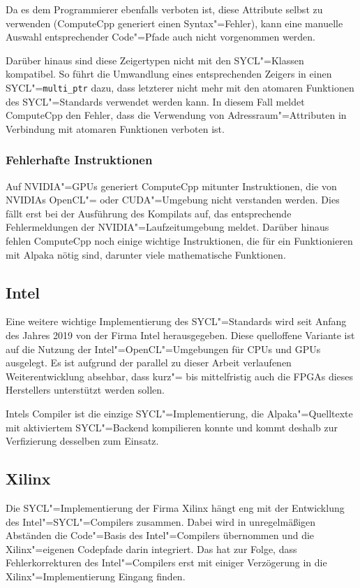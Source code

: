 Da es dem Programmierer ebenfalls verboten ist, diese Attribute selbst zu
verwenden (ComputeCpp generiert einen Syntax"=Fehler), kann eine manuelle
Auswahl entsprechender Code"=Pfade auch nicht vorgenommen werden.

Darüber hinaus sind diese Zeigertypen nicht mit den SYCL"=Klassen kompatibel.
So führt die Umwandlung eines entsprechenden Zeigers in einen
SYCL"=\texttt{multi\_ptr} dazu, dass letzterer nicht mehr mit den atomaren
Funktionen des SYCL"=Standards verwendet werden kann. In diesem Fall meldet
ComputeCpp den Fehler, dass die Verwendung von Adressraum"=Attributen in
Verbindung mit atomaren Funktionen verboten ist.

\subsubsection{Fehlerhafte Instruktionen}

Auf NVIDIA"=GPUs generiert ComputeCpp mitunter Instruktionen, die von NVIDIAs
OpenCL"= oder CUDA"=Umgebung nicht verstanden werden. Dies fällt erst bei der
Ausführung des Kompilats auf, das entsprechende Fehlermeldungen der
NVIDIA"=Laufzeitumgebung meldet. Darüber hinaus fehlen ComputeCpp noch einige
wichtige Instruktionen, die für ein Funktionieren mit Alpaka nötig sind,
darunter viele mathematische Funktionen.

\subsection{Intel}

Eine weitere wichtige Implementierung des SYCL"=Standards wird seit Anfang des
Jahres 2019 von der Firma Intel herausgegeben. Diese quelloffene Variante ist
auf die Nutzung der Intel"=OpenCL"=Umgebungen für CPUs und GPUs ausgelegt. Es
ist aufgrund der parallel zu dieser Arbeit verlaufenen Weiterentwicklung
absehbar, dass kurz"= bis mittelfristig auch die FPGAs dieses Herstellers
unterstützt werden sollen.

Intels Compiler ist die einzige SYCL"=Implementierung, die Alpaka"=Quelltexte
mit aktiviertem SYCL"=Backend kompilieren konnte und kommt deshalb zur
Verfizierung desselben zum Einsatz.

\subsection{Xilinx}

Die SYCL"=Implementierung der Firma Xilinx hängt eng mit der Entwicklung des
Intel"=SYCL"=Compilers zusammen. Dabei wird in unregelmäßigen Abständen die
Code"=Basis des Intel"=Compilers übernommen und die Xilinx"=eigenen Codepfade
darin integriert. Das hat zur Folge, dass Fehlerkorrekturen des Intel"=Compilers
erst mit einiger Verzögerung in die Xilinx"=Implementierung Eingang finden.

